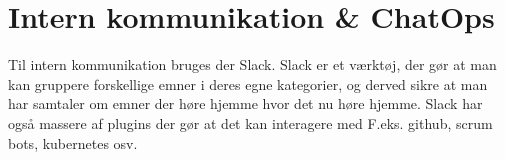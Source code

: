 \section{Intern kommunikation \& ChatOps}

Til intern kommunikation bruges der Slack. Slack er et værktøj, der gør at man kan gruppere forskellige emner i deres egne kategorier, og derved sikre at man har samtaler om emner der høre hjemme hvor det nu høre hjemme. Slack har også massere af plugins der gør at det kan interagere med F.eks. github, scrum bots, kubernetes osv.